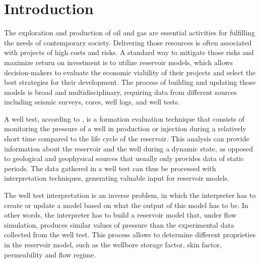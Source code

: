 \chapter{Introduction}
\label{chapter-introduction}

\pagestyle{fancy}
\setcounter{page}{1}

The exploration and production of oil and gas are essential activities for fulfilling the needs of contemporary society.
%
Delivering those resources is often associated with projects of high costs and risks.
%
A standard way to mitigate those risks and maximize return on investment is to utilize reservoir models, which allows decision-makers to evaluate the economic viability of their projects and select the best strategies for their development.
%
The process of building and updating those models is broad and multidisciplinary, requiring data from different sources including seismic surveys, cores, well logs, and well tests.

A well test, according to \cite{Bourdet2002},  is a formation evaluation technique that consists of monitoring the pressure of a well in production or injection during a relatively short time compared to the life cycle of the reservoir. 
%
This analysis can provide information about the reservoir and the well during a dynamic state, as opposed to geological and geophysical sources that usually only provides data of static periods.
%
The data gathered in a well test can thus be processed with interpretation techniques, generating valuable input for reservoir models.

The well test interpretation is an inverse problem, in which the interpreter has to create or update a model based on what the output of this model has to be.
%
In other words, the interpreter has to build a reservoir model that, under flow simulation, produces similar values of pressure than the experimental data collected from the well test.
%
This process allows to determine different proprieties in the reservoir model, such as the wellbore storage factor, skin factor, permeability and flow regime.

